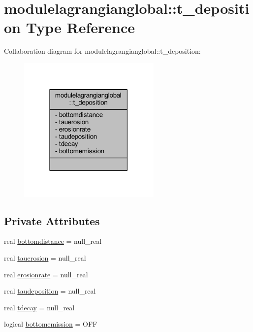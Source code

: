 \hypertarget{structmodulelagrangianglobal_1_1t__deposition}{}\section{modulelagrangianglobal\+:\+:t\+\_\+deposition Type Reference}
\label{structmodulelagrangianglobal_1_1t__deposition}


Collaboration diagram for modulelagrangianglobal\+:\+:t\+\_\+deposition\+:\nopagebreak
\begin{figure}[H]
\begin{center}
\leavevmode
\includegraphics[width=198pt]{structmodulelagrangianglobal_1_1t__deposition__coll__graph}
\end{center}
\end{figure}
\subsection*{Private Attributes}
\begin{DoxyCompactItemize}
\item 
real \mbox{\hyperlink{structmodulelagrangianglobal_1_1t__deposition_ae756046e578bb9251d58aab9e2541816}{bottomdistance}} = null\+\_\+real
\item 
real \mbox{\hyperlink{structmodulelagrangianglobal_1_1t__deposition_ad77831bdf18ab3a057079eefce642f12}{tauerosion}} = null\+\_\+real
\item 
real \mbox{\hyperlink{structmodulelagrangianglobal_1_1t__deposition_ab6e103893277df36cad6bfe3ccc173d9}{erosionrate}} = null\+\_\+real
\item 
real \mbox{\hyperlink{structmodulelagrangianglobal_1_1t__deposition_a92ee44bee53592fcfbf147cc9aa84486}{taudeposition}} = null\+\_\+real
\item 
real \mbox{\hyperlink{structmodulelagrangianglobal_1_1t__deposition_ac62f682aefdb8c709be92b3625033a4b}{tdecay}} = null\+\_\+real
\item 
logical \mbox{\hyperlink{structmodulelagrangianglobal_1_1t__deposition_a50fff18506be944f84820435187e4468}{bottomemission}} = O\+FF
\end{DoxyCompactItemize}


